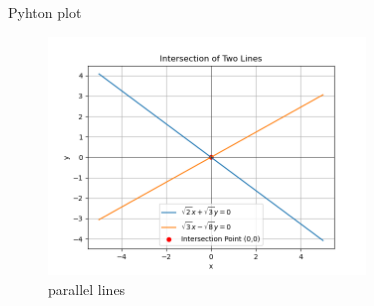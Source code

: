 \documentclass{beamer}
\begin{document}
\begin{frame}{Pyhton plot}
\begin{figure}[h!]
    \centering
    \includegraphics[width=0.75\textwidth]{figs/10.png}
    \caption{parallel lines}
    \label{fig:example_image}
\end{figure}
\end{frame}
\end{document}
